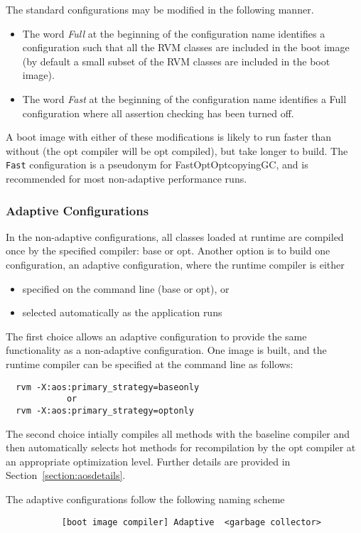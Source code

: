 The standard configurations may be modified in the following manner. 
\begin{itemize}
\item The word 
{\em Full} at the beginning of the configuration name identifies a 
configuration
such that all the RVM classes are included in the boot image (by default
a small subset of the RVM classes are included in the boot image). 
\item The word
{\em Fast} at the beginning of the configuration name identifies a Full
configuration where all assertion checking has been turned off. 
\end{itemize}
A boot image with
either of these modifications is likely to run faster than without
(the opt compiler will be opt compiled),
but take longer to build.  The {\tt
Fast} configuration is a pseudonym for FastOptOptcopyingGC, and is
recommended for most non-adaptive performance runs.

\subsubsection{Adaptive Configurations} \label{adaptive-configs}
In the non-adaptive configurations, all classes
loaded at runtime are compiled once by the specified
compiler: base or opt.  Another option is to build one configuration,
an adaptive configuration,
where the runtime compiler is either
\begin{itemize}
\item specified on the command line (base or opt), or
\item selected automatically as the application runs
\end{itemize}

The first choice allows an adaptive configuration to provide the same
functionality as a non-adaptive configuration.  One image is built,
and the runtime compiler can be specified at the command line as
follows:
\begin{verbatim}
  rvm -X:aos:primary_strategy=baseonly
            or
  rvm -X:aos:primary_strategy=optonly
\end{verbatim}

The second choice intially compiles all methods with the
baseline compiler and then automatically selects hot methods for
recompilation by the opt compiler at an appropriate optimization
level. Further details are provided in Section~\ref{section:aosdetails}.

The adaptive configurations follow the following naming scheme
\begin{verbatim}
           [boot image compiler] Adaptive  <garbage collector>
\end{verbatim}

